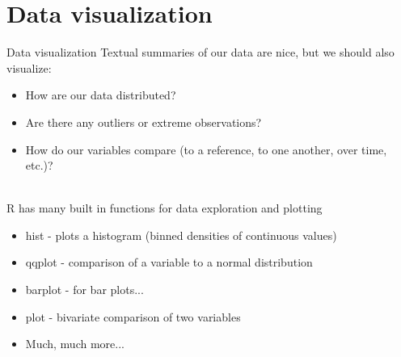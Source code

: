 \documentclass[xcolor=svgnames]{beamer}
\begin{document}
\section{Data visualization}

\begin{frame}[fragile]{Data visualization}
Textual summaries of our data are nice, but we should also visualize:
\begin{itemize}
\item How are our data distributed?
\item Are there any outliers or extreme observations?
\item How do our variables compare (to a reference, to one another, over time, etc.)?\\~\\
\end{itemize}
R has many built in functions for data exploration and plotting
\begin{itemize}
\item hist - plots a histogram (binned densities of continuous values)
\item qqplot - comparison of a variable to a normal distribution
\item barplot - for bar plots...
\item plot - bivariate comparison of two variables
\item Much, much more...
\end{itemize}
\end{frame}
\end{document}

